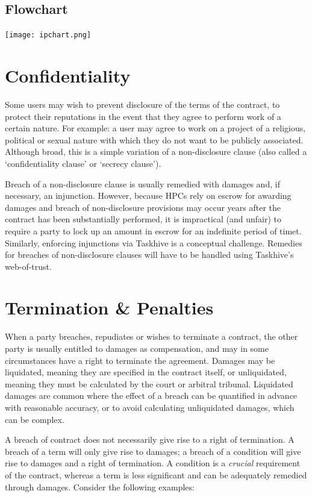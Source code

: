 \documentclass[a4paper,12pt]{article}
\begin{document}
\subsection{Flowchart}

\texttt{[image: ipchart.png]}

\section{Confidentiality}

Some users may wish to prevent disclosure of the terms of the contract, to protect their reputations in the event that they agree to perform work of a certain nature. For example: a user may agree to work on a project of a religious, political or sexual nature with which they do not want to be publicly associated. Although broad, this is a simple variation of a non-disclosure clause (also called a `confidentiality clause' or `secrecy clause').

Breach of a non-disclosure clause is usually remedied with damages and, if necessary, an injunction. However, because HPCs rely on escrow for awarding damages and breach of non-disclosure provisions may occur years after the contract has been substantially performed, it is impractical (and unfair) to require a party to lock up an amount in escrow for an indefinite period of timet. Similarly, enforcing injunctions via Taskhive is a conceptual challenge. Remedies for breaches of non-disclosure clauses will have to be handled using Taskhive's web-of-trust.

\section{Termination \& Penalties}

When a party breaches, repudiates or wishes to terminate a contract, the other party is usually entitled to damages as compensation, and may in some circumstances have a right to terminate the agreement. Damages may be liquidated, meaning they are specified in the contract itself, or unliquidated, meaning they must be calculated by the court or arbitral tribunal. Liquidated damages are common where the effect of a breach can be quantified in advance with reasonable accuracy, or to avoid calculating unliquidated damages, which can be complex.

A breach of contract does not necessarily give rise to a right of termination. A breach of a term will only give rise to damages; a breach of a condition will give rise to damages and a right of termination. A condition is a \textit{crucial} requirement of the contract, whereas a term is less significant and can be adequately remedied through damages. Consider the following examples:
\end{document}
